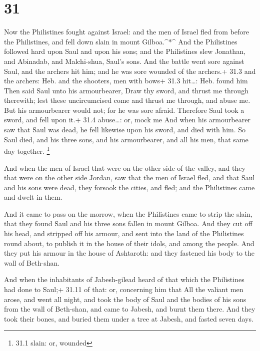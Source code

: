 \hypertarget{section-30}{%
\section{31}\label{section-30}}

 Now the Philistines fought against Israel: and the men of
Israel fled from before the Philistines, and fell down slain in mount
Gilboa.\^{}*\^{}  And the Philistines followed hard upon
Saul and upon his sons; and the Philistines slew Jonathan, and Abinadab,
and Malchi-shua, Saul's sons.  And the battle went sore
against Saul, and the archers hit him; and he was sore wounded of the
archers.+ 31.3 and the archers: Heb. and the shooters, men with bows+
31.3 hit\ldots: Heb. found him  Then said Saul unto his
armourbearer, Draw thy sword, and thrust me through therewith; lest
these uncircumcised come and thrust me through, and abuse me. But his
armourbearer would not; for he was sore afraid. Therefore Saul took a
sword, and fell upon it.+ 31.4 abuse\ldots: or, mock me  And
when his armourbearer saw that Saul was dead, he fell likewise upon his
sword, and died with him.  So Saul died, and his three sons,
and his armourbearer, and all his men, that same day together.
\footnote{31.1 slain: or, wounded}

 And when the men of Israel that were on the other side of
the valley, and they that were on the other side Jordan, saw that the
men of Israel fled, and that Saul and his sons were dead, they forsook
the cities, and fled; and the Philistines came and dwelt in them.

 And it came to pass on the morrow, when the Philistines
came to strip the slain, that they found Saul and his three sons fallen
in mount Gilboa.  And they cut off his head, and stripped
off his armour, and sent into the land of the Philistines round about,
to publish it in the house of their idols, and among the people.
 And they put his armour in the house of Ashtaroth: and
they fastened his body to the wall of Beth-shan.

 And when the inhabitants of Jabesh-gilead heard of that
which the Philistines had done to Saul;+ 31.11 of that: or, concerning
him that  All the valiant men arose, and went all night,
and took the body of Saul and the bodies of his sons from the wall of
Beth-shan, and came to Jabesh, and burnt them there.  And
they took their bones, and buried them under a tree at Jabesh, and
fasted seven days.
